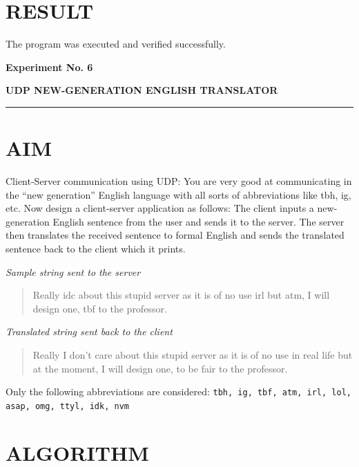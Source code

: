 \documentclass[12pt,a4paper]{article}
\newcommand{\experiment}[2]{
	\newpage
	
	\begin{center}
		\noindent
		\begin{minipage}{\textwidth}
			\centering
			{\textbf{\Large Experiment No. #1}}
			
			\vspace{1cm}
			
			\textbf{\Large #2}
		\end{minipage}
		
		\vspace{0.3cm}
		\noindent\rule{\textwidth}{0.6pt}
	\end{center}
}
\begin{document}
	\section*{RESULT}
	\vspace{-0.1cm}
	The program was executed and verified successfully.
	

	
	
	\experiment{6}{UDP NEW-GENERATION ENGLISH TRANSLATOR}
	
	\section*{AIM}
	
	Client-Server communication using UDP: You are very good at communicating in the
	``new generation'' English language with all sorts of abbreviations like tbh, ig, etc. Now
	design a client-server application as follows: The client inputs a new-generation English
	sentence from the user and sends it to the server. The server then translates the received
	sentence to formal English and sends the translated sentence back to the client which it
	prints.
	
	\textit{Sample string sent to the server}
	
	\begin{quote}
		\ttfamily
		Really idc about this stupid server as it is of no use irl but atm,
		I will design one, tbf to the professor.
	\end{quote}
	
	\textit{Translated string sent back to the client}
	\begin{quote}
		\ttfamily
		Really I don't care about this stupid server as it is of no use in
		real life but at the moment, I will design one, to be fair to the
		professor.
	\end{quote}
	
	Only the following abbreviations are considered:
	\texttt{tbh, ig, tbf, atm, irl, lol, asap, omg, ttyl, idk, nvm}
	
	\section*{ALGORITHM}
\end{document}
